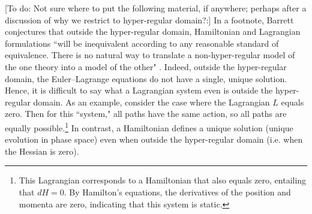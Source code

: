 \documentclass[letterpaper]{article}
\begin{document}
[To do: Not sure where to put the following material, if anywhere; perhaps after a discussion of why we restrict to hyper-regular domain?:]
In a footnote, Barrett conjectures that outside the hyper-regular domain, Hamiltonian and Lagrangian formulations ``will be inequivalent according to any reasonable standard of equivalence. There is no natural way to translate a non-hyper-regular model of the one theory into a model of the other" \parencites*[1179]{Barrett2}. Indeed, outside the hyper-regular domain, the Euler--Lagrange equations do not have a single, unique solution. Hence, it is difficult to say what a Lagrangian system even is outside the hyper-regular domain. As an example, consider the case where the Lagrangian $L$ equals zero. Then for this ``system," all paths have the same action, so all paths are equally possible.\footnote{This Lagrangian corresponds to a Hamiltonian that also equals zero, entailing that $dH = 0 $. By Hamilton's equations, the derivatives of the position and momenta are zero, indicating that this system is static.} In contrast,  a Hamiltonian defines a unique solution (unique evolution in phase space) even when outside the hyper-regular domain (i.e. when the Hessian is zero). 
\end{document}
